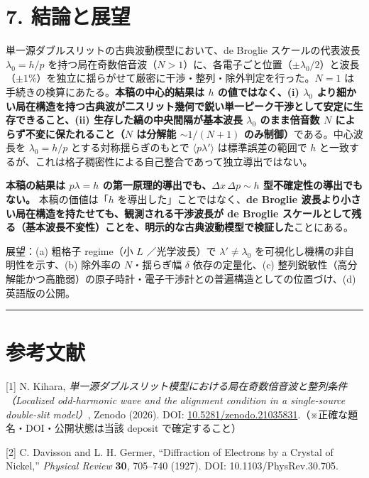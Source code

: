 \documentclass[11pt,a4paper]{ltjsarticle}
\begin{document}
\section{7. 結論と展望}\label{ux7d50ux8ad6ux3068ux5c55ux671b}

単一源ダブルスリットの古典波動模型において、de Broglie
スケールの代表波長 \(\lambda_0=h/p\)
を持つ局在奇数倍音波（\(N>1\)）に、各電子ごと位置（\(\pm\lambda_0/2\)）と波長（\(\pm1\%\)）を独立に揺らがせて厳密に干渉・整列・除外判定を行った。\(N=1\)
は手続きの検算にあたる。\textbf{本稿の中心的結果は \(h\)
の値ではなく、(i) \(\lambda_0\)
より細かい局在構造を持つ古典波が二スリット幾何で鋭い単一ピーク干渉として安定に生存できること、(ii)
生存した縞の中央間隔が基本波長 \(\lambda_0\) のまま倍音数 \(N\)
によらず不変に保たれること（\(N\) は分解能 \(\sim1/(N{+}1)\)
のみ制御）}である。中心波長を \(\lambda_0=h/p\) とする対称揺らぎのもとで
\(\langle p\lambda'\rangle\) は標準誤差の範囲で \(h\)
と一致するが、これは格子稠密性による自己整合であって独立導出ではない。

\textbf{本稿の結果は \(p\lambda=h\)
の第一原理的導出でも、\(\Delta x\,\Delta p\sim h\)
型不確定性の導出でもない。} 本稿の価値は「\(h\)
を導出した」ことではなく、\textbf{de Broglie
波長より小さい局在構造を持たせても、観測される干渉波長が de Broglie
スケールとして残る（基本波長不変性）ことを、明示的な古典波動模型で検証した}ことにある。

展望：(a) 粗格子 regime（小 \(L\) ／光学波長）で
\(\lambda'\ne\lambda_0\) を可視化し機構の非自明性を示す、(b) 除外率の
\(N\)・揺らぎ幅 \(\delta\) 依存の定量化、(c)
整列鋭敏性（高分解能かつ高脆弱）の原子時計・電子干渉計との普遍構造としての位置づけ、(d)
英語版の公開。

\begin{center}\rule{0.5\linewidth}{0.5pt}\end{center}

\section{参考文献}\label{ux53c2ux8003ux6587ux732e}

{[}1{]} N. Kihara,
\emph{単一源ダブルスリット模型における局在奇数倍音波と整列条件（Localized
odd-harmonic wave and the alignment condition in a single-source
double-slit model）}, Zenodo (2026). DOI:
\href{https://doi.org/10.5281/zenodo.21035831}{10.5281/zenodo.21035831}.（※正確な題名・DOI・公開状態は当該
deposit で確定すること）

{[}2{]} C. Davisson and L. H. Germer, ``Diffraction of Electrons by a
Crystal of Nickel,'' \emph{Physical Review} \textbf{30}, 705--740
(1927). DOI: 10.1103/PhysRev.30.705.
\end{document}
